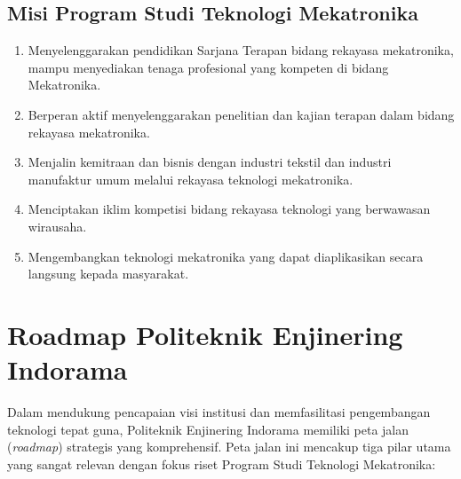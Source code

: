 \subsection{Misi Program Studi Teknologi Mekatronika}
\begin{enumerate}[label=\arabic*.]
    \item Menyelenggarakan pendidikan Sarjana Terapan bidang rekayasa mekatronika, mampu menyediakan tenaga profesional yang kompeten di bidang Mekatronika.
    \item Berperan aktif menyelenggarakan penelitian dan kajian terapan dalam bidang rekayasa mekatronika.
    \item Menjalin kemitraan dan bisnis dengan industri tekstil dan industri manufaktur umum melalui rekayasa teknologi mekatronika.
    \item Menciptakan iklim kompetisi bidang rekayasa teknologi yang berwawasan wirausaha.
    \item Mengembangkan teknologi mekatronika yang dapat diaplikasikan secara langsung kepada masyarakat.
\end{enumerate}

\section{Roadmap Politeknik Enjinering Indorama}
Dalam mendukung pencapaian visi institusi dan memfasilitasi pengembangan teknologi tepat guna, Politeknik Enjinering Indorama memiliki peta jalan (\textit{roadmap}) strategis yang komprehensif. Peta jalan ini mencakup tiga pilar utama yang sangat relevan dengan fokus riset Program Studi Teknologi Mekatronika:


